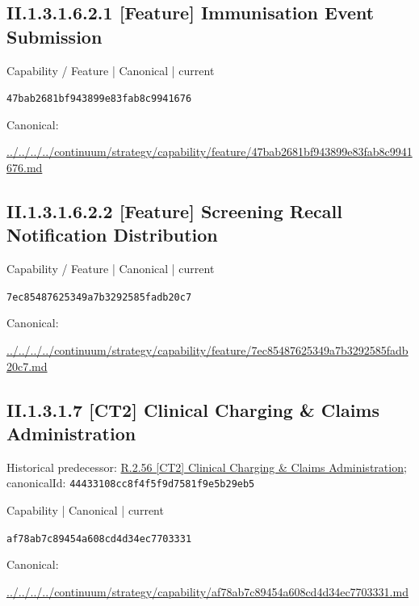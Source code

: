 \documentclass[10pt,a4paper]{article}
\begin{document}
\subsection*{II.1.3.1.6.2.1 [Feature] Immunisation Event Submission}
\label{element-47bab2681bf943899e83fab8c9941676}
{\small Capability / Feature | Canonical | current}\par
\texttt{47bab2681bf943899e83fab8c9941676}\par
Canonical: \par
{\footnotesize\url{../../../../continuum/strategy/capability/feature/47bab2681bf943899e83fab8c9941676.md}}\par
\subsection*{II.1.3.1.6.2.2 [Feature] Screening Recall Notification Distribution}
\label{element-7ec85487625349a7b3292585fadb20c7}
{\small Capability / Feature | Canonical | current}\par
\texttt{7ec85487625349a7b3292585fadb20c7}\par
Canonical: \par
{\footnotesize\url{../../../../continuum/strategy/capability/feature/7ec85487625349a7b3292585fadb20c7.md}}\par
\subsection*{II.1.3.1.7 [CT2] Clinical Charging \& Claims Administration}
Historical predecessor: \hyperref[element-44433108cc8f4f5f9d7581f9e5b29eb5]{R.2.56 [CT2] Clinical Charging \& Claims Administration}; canonicalId: \texttt{44433108cc8f4f5f9d7581f9e5b29eb5}\par
\label{element-af78ab7c89454a608cd4d34ec7703331}
{\small Capability | Canonical | current}\par
\texttt{af78ab7c89454a608cd4d34ec7703331}\par
Canonical: \par
{\footnotesize\url{../../../../continuum/strategy/capability/af78ab7c89454a608cd4d34ec7703331.md}}\par
\end{document}

